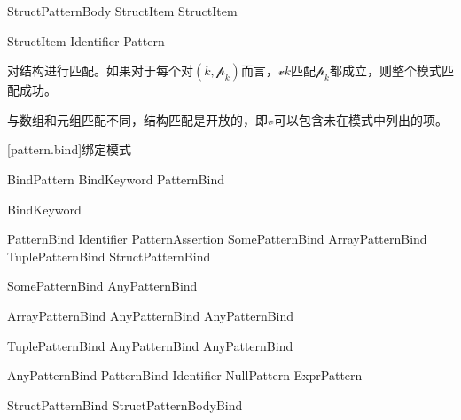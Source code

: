 \begin{bnf}{StructPatternBody}
    StructItem \bnflp\terminal{,} StructItem\bnfrp\bnfs
\end{bnf}

\begin{bnf}{StructItem}
    Identifier \terminal{:} Pattern
\end{bnf}

\pnum
{}对结构进行匹配。如果对于每个对$(k, \mathcal{p}_k)$而言，$\mathcal{v}$$k$匹配$\mathcal{p}_k$都成立，则整个模式匹配成功。

\pnum
与数组和元组匹配不同，结构匹配是开放的，即$\mathcal{v}$可以包含未在模式中列出的项。

[pattern.bind]{绑定模式}

\begin{bnf}{BindPattern}
    BindKeyword PatternBind
\end{bnf}

\begin{bnf}{BindKeyword}
     \br
      \br
     
\end{bnf}

\begin{bnf}{PatternBind}
    Identifier PatternAssertion \br
    SomePatternBind \br
    ArrayPatternBind \br
    TuplePatternBind \br
    StructPatternBind
\end{bnf}

\begin{bnf}{SomePatternBind}
     AnyPatternBind
\end{bnf}

\begin{bnf}{ArrayPatternBind}
    \terminal{[} AnyPatternBind \bnflp\terminal{,} AnyPatternBind\bnfrp\bnfs \terminal{]}
\end{bnf}

\begin{bnf}{TuplePatternBind}
    \terminal{(} AnyPatternBind \bnflp\terminal{,} AnyPatternBind\bnfrp\bnfs \terminal{)}
\end{bnf}

\begin{bnf}{AnyPatternBind}
    PatternBind \br
     Identifier\bnfq \br
    NullPattern \br
    ExprPattern
\end{bnf}

\begin{bnf}{StructPatternBind}
    \terminal{\{} StructPatternBodyBind \terminal{\}}
\end{bnf}

